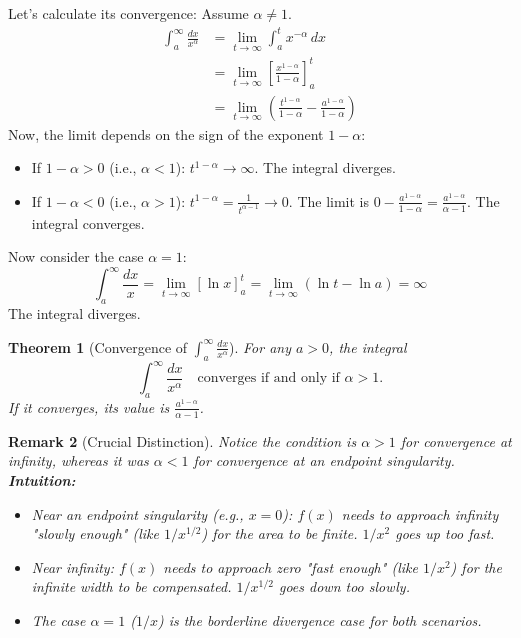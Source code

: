 \documentclass[11pt]{article}
\theoremstyle{mytheoremstyle}
\newtheorem{theorem}{Theorem}[section]
\theoremstyle{mydefinitionstyle}
\newtheorem{remark}[theorem]{Remark}
\begin{document}
Let's calculate its convergence: Assume $\alpha \ne 1$.
\begin{align*} \int_a^\infty \frac{dx}{x^\alpha} &= \lim_{t \to \infty} \int_a^t x^{-\alpha} \, dx \\ &= \lim_{t \to \infty} \left[ \frac{x^{1-\alpha}}{1-\alpha} \right]_a^t \\ &= \lim_{t \to \infty} \left( \frac{t^{1-\alpha}}{1-\alpha} - \frac{a^{1-\alpha}}{1-\alpha} \right) \end{align*}
Now, the limit depends on the sign of the exponent $1-\alpha$:
\begin{itemize}
    \item If $1-\alpha > 0$ (i.e., $\alpha < 1$): $t^{1-\alpha} \to \infty$. The integral diverges.
    \item If $1-\alpha < 0$ (i.e., $\alpha > 1$): $t^{1-\alpha} = \frac{1}{t^{\alpha-1}} \to 0$. The limit is $0 - \frac{a^{1-\alpha}}{1-\alpha} = \frac{a^{1-\alpha}}{\alpha-1}$. The integral converges.
\end{itemize}
Now consider the case $\alpha = 1$:
\[ \int_a^\infty \frac{dx}{x} = \lim_{t \to \infty} [\ln x]_a^t = \lim_{t \to \infty} (\ln t - \ln a) = \infty \]
The integral diverges.

\begin{theorem}[Convergence of $\int_a^\infty \frac{dx}{x^\alpha}$]
For any $a > 0$, the integral
\[ \int_a^\infty \frac{dx}{x^\alpha} \quad \text{converges if and only if } \alpha > 1. \]
If it converges, its value is $\frac{a^{1-\alpha}}{\alpha-1}$.
\end{theorem}

\begin{remark}[Crucial Distinction]
Notice the condition is $\alpha > 1$ for convergence at infinity, whereas it was $\alpha < 1$ for convergence at an endpoint singularity.
\textbf{Intuition:}
\begin{itemize}
    \item Near an endpoint singularity (e.g., $x=0$): $f(x)$ needs to approach infinity "slowly enough" (like $1/x^{1/2}$) for the area to be finite. $1/x^2$ goes up too fast.
    \item Near infinity: $f(x)$ needs to approach zero "fast enough" (like $1/x^2$) for the infinite width to be compensated. $1/x^{1/2}$ goes down too slowly.
    \item The case $\alpha=1$ ($1/x$) is the borderline divergence case for both scenarios.
\end{itemize}
\end{remark}
\end{document}
